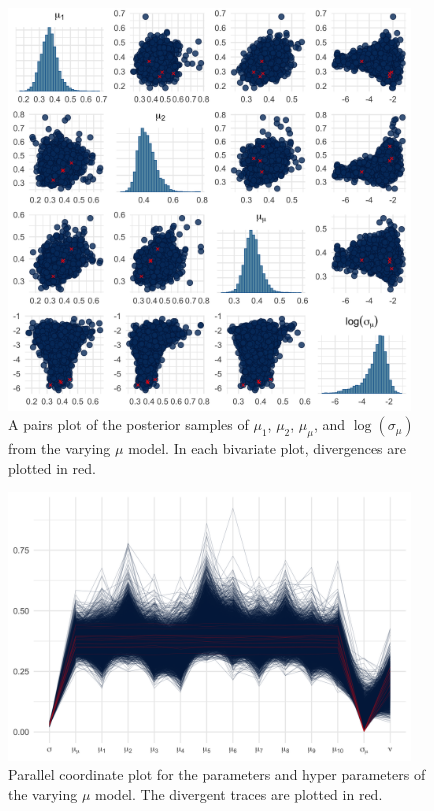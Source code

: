 \begin{figure}[tbp]
   \centering
   \includegraphics[width=0.95\textwidth]{./figures/ch-5/plot-pp-mu-pairs.png}
   \caption{A pairs plot of the posterior samples of $\mu_1$, $\mu_2$, $\mu_\mu$, and $\log(\sigma_\mu)$ from the varying $\mu$ model. In each bivariate plot, divergences are plotted in red.}
   \label{fig:pp_mu_pairs} 
\end{figure}

\begin{figure}[tbp]
   \centering
   \includegraphics[width=0.95\textwidth]{./figures/ch-5/plot-pp-mu-parcoord.png}
   \caption{Parallel coordinate plot for the parameters and hyper parameters of the varying $\mu$ model. The divergent traces are plotted in red.}
   \label{fig:pp_mu_parcoord} 
\end{figure}

